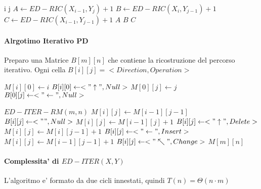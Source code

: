 \begin{algorithm}
    \begin{algorithmic}
                \State \Return i
                \State \Return j
            \Else
                \State $A \gets ED-RIC(X_{i-1}, Y_{j}) + 1$
                \State $B \gets ED-RIC(X_{i}, Y_{j-1}) + 1$
                \State $C \gets ED-RIC(X_{i-1}, Y_{j-1}) + 1$
                    \State \Return $A$
                    \State \Return $B$
                \Else
                    \State \Return $C$
                \EndIf
            \EndIf
        \EndProcedure
    \end{algorithmic}
\end{algorithm}

\paragraph{Alrgotimo Iterativo PD}

Preparo una Matrice $B[m][n]$ che contiene la ricostruzione del percorso iterativo.
Ogni cella $B[i][j] = <Direction, Operation>$

\begin{algorithm}
    \begin{algorithmic}
                \State $M[i][0] \gets i$
                \State $B[i][0] \gets <"\uparrow", Null>$
            \EndFor
                \State $M[0][j] \gets j$
                \State $B[0][j] \gets <"\leftarrow", Null>$
            \EndFor
        \EndProcedure
    \end{algorithmic}
\end{algorithm}


\begin{algorithm}
    \begin{algorithmic}
            \State $ED-ITER-RM(m, n)$
                        \State $M[i][j] \gets M[i-1][j-1]$
                        \State $B[i][j] \gets <"", Null>$
                        \State $M[i][j] \gets M[i-1][j] + 1$
                        \State $B[i][j] \gets <"\uparrow", Delete>$
                        \State $M[i][j] \gets M[i][j-1] + 1$
                        \State $B[i][j] \gets <"\leftarrow", Insert>$
                    \Else
                        \State $M[i][j] \gets M[i-1][j-1] + 1$
                        \State $B[i][j] \gets <"\nwarrow", Change>$
                    \EndIf
                \EndFor
            \EndFor
            \State \Return $M[m][n]$
        \EndProcedure
    \end{algorithmic}
\end{algorithm}

\paragraph{Complessita' di $ED-ITER(X, Y)$}

L'algoritmo e' formato da due cicli innestati, quindi $T(n) = \Theta(n \cdot m)$
